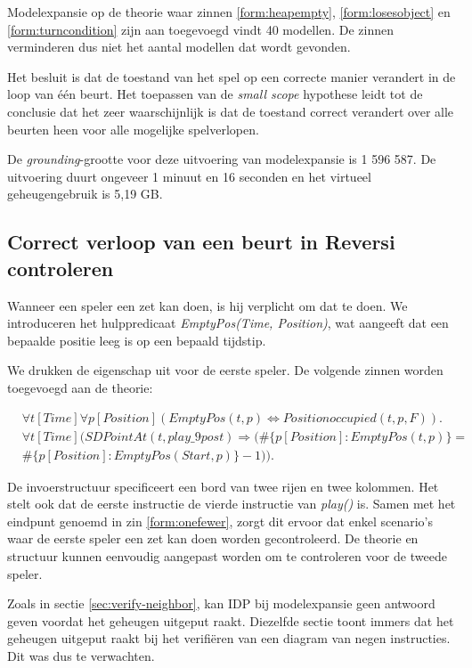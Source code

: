 Modelexpansie op de theorie waar zinnen \ref{form:heapempty}, \ref{form:losesobject} en \ref{form:turncondition} zijn aan toegevoegd vindt 40 modellen. De zinnen verminderen dus niet het aantal modellen dat wordt gevonden.

Het besluit is dat de toestand van het spel op een correcte manier verandert in de loop van \'e\'en beurt. Het toepassen van de \textit{small scope} hypothese leidt tot de conclusie dat het zeer waarschijnlijk is dat de toestand correct verandert over alle beurten heen voor alle mogelijke spelverlopen.

De \textit{grounding}-grootte voor deze uitvoering van modelexpansie is 1 596 587. De uitvoering duurt ongeveer 1 minuut en 16 seconden en het virtueel geheugengebruik is 5,19 GB.

\subsection{Correct verloop van een beurt in Reversi controleren}

Wanneer een speler een zet kan doen, is hij verplicht om dat te doen. We introduceren het hulppredicaat \textit{EmptyPos(Time, Position)}, wat aangeeft dat een bepaalde positie leeg is op een bepaald tijdstip.

We drukken de eigenschap uit voor de eerste speler. De volgende zinnen worden toegevoegd aan de theorie:

\begin{align}
	&\forall{t}[Time]\forall{p}[Position](EmptyPos(t, p) \Leftrightarrow Positionoccupied(t, p, F)).\label{form:emptypos} \\
	\nonumber &\forall{t}[Time](SDPointAt(t, play\_9post) \Rightarrow (\#\{p [Position] : EmptyPos(t, p)\} = \\ &\#\{p [Position] : EmptyPos(Start, p)\} - 1)).\label{form:onefewer}
\end{align}

De invoerstructuur specificeert een bord van twee rijen en twee kolommen. Het stelt ook dat de eerste instructie de vierde instructie van \textit{play()} is. Samen met het eindpunt genoemd in zin \ref{form:onefewer}, zorgt dit ervoor dat enkel scenario's waar de eerste speler een zet kan doen worden gecontroleerd. De theorie en structuur kunnen eenvoudig aangepast worden om te controleren voor de tweede speler.

Zoals in sectie \ref{sec:verify-neighbor}, kan IDP bij modelexpansie geen antwoord geven voordat het geheugen uitgeput raakt. Diezelfde sectie toont immers dat het geheugen uitgeput raakt bij het verifi\"eren van een diagram van negen instructies. Dit was dus te verwachten.

